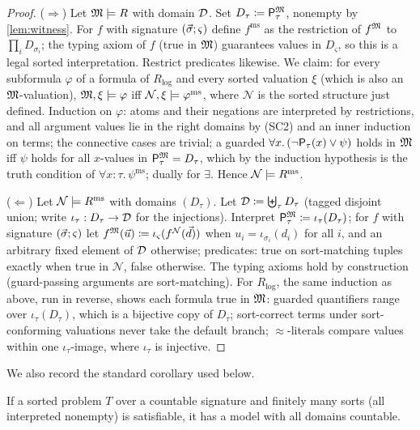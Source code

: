 \begin{proof}
($\Rightarrow$)  Let $\mathfrak{M} \models R$ with domain $\mathcal{D}$.  Set
$D_\tau \coloneqq \mathsf{P}_{\tau}^{\mathfrak{M}}$, nonempty by
\cref{lem:witness}.  For $f$ with signature $(\vec{\sigma};
\varsigma)$ define $f^{\mathrm{ms}}$ as the restriction of
$f^{\mathfrak{M}}$ to $\prod_i D_{\sigma_i}$; the typing axiom of $f$ (true
in $\mathfrak{M}$) guarantees values in $D_\varsigma$, so this is a legal
sorted interpretation.  Restrict predicates likewise.  We claim: for
every subformula $\varphi$ of a formula of $R_{\mathrm{log}}$ and
every sorted valuation $\xi$ (which is also an $\mathfrak{M}$-valuation),
$\mathfrak{M}, \xi \models \varphi$ iff $\mathcal{N}, \xi \models
\varphi^{\mathrm{ms}}$, where $\mathcal{N}$ is the sorted structure
just defined.  Induction on $\varphi$: atoms and their negations are
interpreted by restrictions, and all argument values lie in the
right domains by (SC2) and an inner induction on terms; the
connective cases are trivial; a guarded $\forall x.\,
(\neg\mathsf{P}_{\tau}(x) \vee \psi)$ holds in $\mathfrak{M}$ iff $\psi$ holds for
all $x$-values in $\mathsf{P}_{\tau}^{\mathfrak{M}} = D_\tau$, which by the
induction hypothesis is the truth condition of $\forall x{:}\tau.\,
\psi^{\mathrm{ms}}$; dually for $\exists$.  Hence $\mathcal{N}
\models R^{\mathrm{ms}}$.

($\Leftarrow$)  Let $\mathcal{N} \models R^{\mathrm{ms}}$ with
domains $(D_\tau)$.  Let $\mathcal{D} \coloneqq \biguplus_\tau D_\tau$
(tagged disjoint union; write $\iota_\tau : D_\tau \to \mathcal{D}$ for
the injections).  Interpret $\mathsf{P}_{\tau}^{\mathfrak{M}} \coloneqq
\iota_\tau(D_\tau)$; for $f$ with signature $(\vec{\sigma};
\varsigma)$ let $f^{\mathfrak{M}}(\vec{u}) \coloneqq
\iota_\varsigma(f^{\mathcal{N}}(\vec{d}))$ when $u_i =
\iota_{\sigma_i}(d_i)$ for all $i$, and an arbitrary fixed element
of $\mathcal{D}$ otherwise; predicates: true on sort-matching tuples
exactly when true in $\mathcal{N}$, false otherwise.  The typing
axioms hold by construction (guard-passing arguments are
sort-matching).  For $R_{\mathrm{log}}$, the same induction as
above, run in reverse, shows each formula true in $\mathfrak{M}$: guarded
quantifiers range over $\iota_\tau(D_\tau)$, which is a bijective
copy of $D_\tau$; sort-correct terms under sort-conforming
valuations never take the default branch; $\approx$-literals
compare values within one $\iota_\tau$-image, where $\iota_\tau$ is
injective.
\end{proof}

We also record the standard corollary used below.

\begin{corollary}
\label{cor:ls}
If a sorted problem $T$ over a countable signature and finitely
many sorts (all interpreted nonempty) is satisfiable, it has a
model with all domains countable.
\end{corollary}

